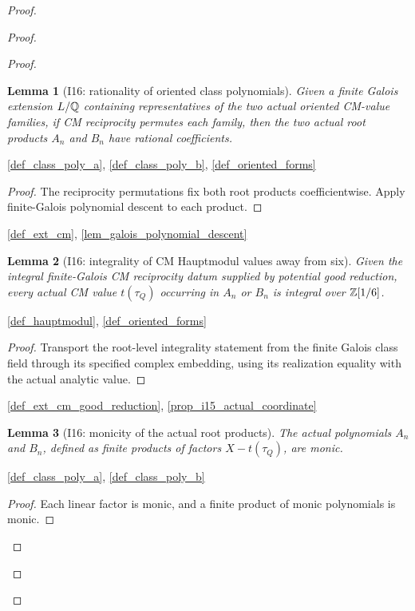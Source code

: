 \documentclass[11pt,a4paper]{article}
\numberwithin{equation}{section}
\theoremstyle{plain}\newtheorem{theorem}{Theorem}[section]\newaliascnt{proposition}{theorem}\newtheorem{proposition}[proposition]{Proposition}\aliascntresetthe{proposition}\newaliascnt{lemma}{theorem}\newtheorem{lemma}[lemma]{Lemma}\aliascntresetthe{lemma}
\theoremstyle{definition}\newaliascnt{definition}{theorem}\newtheorem{definition}[definition]{Definition}\aliascntresetthe{definition}\newaliascnt{notation}{theorem}\newtheorem{notation}[notation]{Notation}\aliascntresetthe{notation}
\providecommand{\lean}[1]{}\providecommand{\leanok}{}
\begin{document}
\begin{proof}
\begin{proof}
\begin{proof}
\begin{lemma}[I16: rationality of oriented class polynomials]\label{lem_i16_rationality}\lean{SptCM.CM.Repaired.ActualOrientedCMCoordinates.actual_class_polynomials_rational_of_integral_E8}\leanok
Given a finite Galois extension $L/\mathbb Q$ containing representatives of the two
actual oriented CM-value families, if CM reciprocity permutes each family,
then the two actual root products $A_n$ and $B_n$ have rational coefficients.
\end{lemma}
\begin{uses-statement}\ref{def_class_poly_a}, \ref{def_class_poly_b}, \ref{def_oriented_forms}\end{uses-statement}
\begin{proof}The reciprocity permutations fix both root products coefficientwise. Apply finite-Galois polynomial descent to each product.\end{proof}
\begin{uses-proof}\ref{def_ext_cm}, \ref{lem_galois_polynomial_descent}\end{uses-proof}

\begin{lemma}[I16: integrality of CM Hauptmodul values away from six]\label{lem_i16_integrality}\lean{SptCM.CM.Repaired.ActualOrientedCMCoordinates.actual_cm_values_integral_awaySix_of_E8}\leanok
Given the integral finite-Galois CM reciprocity datum supplied by potential
good reduction, every actual CM value $t(\tau_Q)$ occurring in $A_n$ or
$B_n$ is integral over $\mathbb Z[1/6]$.
\end{lemma}
\begin{uses-statement}\ref{def_hauptmodul}, \ref{def_oriented_forms}\end{uses-statement}
\begin{proof}Transport the root-level integrality statement from the finite Galois class field through its specified complex embedding, using its realization equality with the actual analytic value.\end{proof}
\begin{uses-proof}\ref{def_ext_cm_good_reduction}, \ref{prop_i15_actual_coordinate}\end{uses-proof}

\begin{lemma}[I16: monicity of the actual root products]\label{lem_i16_monic}\lean{SptCM.CM.Repaired.ActualOrientedCMCoordinates.actual_class_polynomials_monic}\leanok
The actual polynomials $A_n$ and $B_n$, defined as finite products of factors $X-t(\tau_Q)$, are monic.
\end{lemma}
\begin{uses-statement}\ref{def_class_poly_a}, \ref{def_class_poly_b}\end{uses-statement}
\begin{proof}Each linear factor is monic, and a finite product of monic polynomials is monic.\end{proof}


\end{proof}
\end{proof}
\end{proof}
\end{document}
